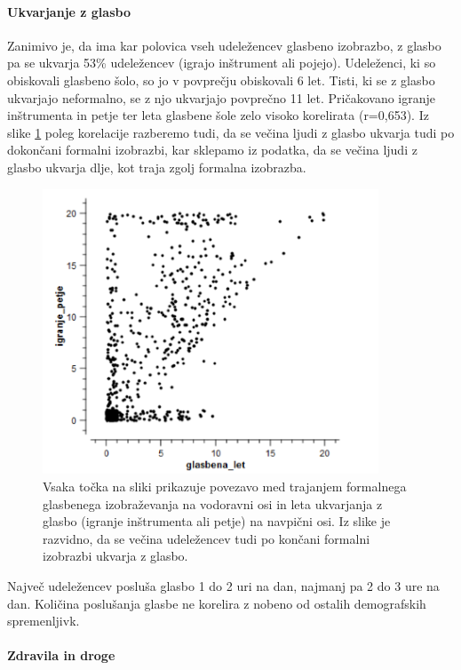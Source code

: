 \documentclass[a4paper, 12pt]{book}
\begin{document}
{\paragraph{Ukvarjanje z glasbo}

Zanimivo je, da ima kar polovica vseh udeležencev glasbeno izobrazbo, z glasbo pa se ukvarja 53\% udeležencev (igrajo inštrument ali pojejo). Udeleženci, ki so obiskovali glasbeno šolo, so jo v povprečju obiskovali 6 let. Tisti, ki se z glasbo ukvarjajo neformalno, se z njo ukvarjajo povprečno 11 let. Pričakovano igranje inštrumenta in petje ter leta glasbene šole zelo visoko korelirata (r=0,653). Iz slike \ref{ukvarjanjeglizobrazba} poleg korelacije razberemo tudi, da se večina ljudi z glasbo ukvarja tudi po dokončani formalni izobrazbi, kar sklepamo iz podatka, da se večina ljudi z glasbo ukvarja dlje, kot traja zgolj formalna izobrazba. 

\begin{figure}[hbt]
\centering
\includegraphics[width=10cm]{images/izobrazba_ukvarjanje.png}

\caption{Vsaka točka na sliki prikazuje povezavo med trajanjem formalnega glasbenega izobraževanja na vodoravni osi in leta ukvarjanja z glasbo (igranje inštrumenta ali petje) na navpični osi.  Iz slike je razvidno, da se večina udeležencev tudi po končani formalni izobrazbi ukvarja z glasbo.  }
\label{ukvarjanjeglizobrazba}
\end{figure}

Največ udeležencev posluša glasbo 1 do 2 uri na dan, najmanj pa 2 do 3 ure na dan. Količina poslušanja glasbe ne korelira z nobeno od ostalih demografskih spremenljivk. 

\paragraph{Zdravila in droge}

}
\end{document}
